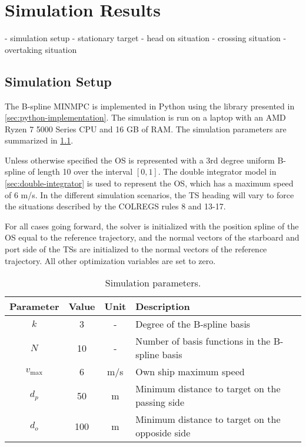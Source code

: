 
\chapter{Simulation Results}\label{chap:simulation-results}

- simulation setup
- stationary target
- head on situation
- crossing situation
- overtaking situation

\section{Simulation Setup}\label{sec:simulation-setup}

The B-spline MINMPC is implemented in Python using the library presented in \cref{sec:python-implementation}. The simulation is run on a laptop with an AMD Ryzen 7 5000 Series CPU and 16 GB of RAM. The simulation parameters are summarized in \cref{tab:simulation-parameters}. 

Unless otherwise specified the OS is represented with a 3rd degree uniform B-spline of length 10 over the interval $[0, 1]$. The double integrator model in \cref{sec:double-integrator} is used to represent the OS, which has a maximum speed of 6 m/s. In the different simulation scenarios, the TS heading will vary to force the situations described by the COLREGS rules 8 and 13-17.

For all cases going forward, the solver is initialized with the position spline of the OS equal to the reference trajectory, and the normal vectors of the starboard and port side of the TSs are initialized to the normal vectors of the reference trajectory. All other optimization variables are set to zero.


\begin{table}[H]
    \centering
    \begin{tabular}{|c|c|c|p{7cm}|}
        \hline
        Parameter & Value & Unit & Description \\
        \hline
        \rule{0pt}{2.5ex}$k$ & 3 & - & Degree of the B-spline basis \\
        \hline
        \rule{0pt}{2.5ex}$N$ & 10 & - & Number of basis functions in the B-spline basis \\
        \hline
        \rule{0pt}{2.5ex}$v_\text{max}$ & 6 & m/s & Own ship maximum speed \\
        \hline
        \rule{0pt}{2.5ex}$d_p$ & 50 & m & Minimum distance to target on the passing side \\
        \hline
        \rule{0pt}{2.5ex}$d_o$ & 100 & m & Minimum distance to target on the opposide side \\
        \hline
    \end{tabular}
    \caption{Simulation parameters.}
    \label{tab:simulation-parameters}
\end{table}


